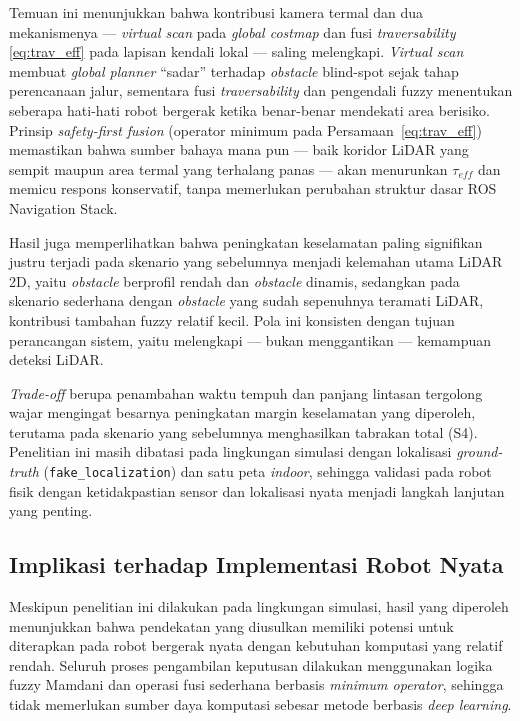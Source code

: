 \documentclass[10pt,twocolumn]{article}
\begin{document}
Temuan ini menunjukkan bahwa kontribusi kamera termal dan dua mekanismenya --- \textit{virtual scan} pada \textit{global costmap} dan fusi \textit{traversability} \eqref{eq:trav_eff} pada lapisan kendali lokal --- saling melengkapi. \textit{Virtual scan} membuat \textit{global planner} ``sadar'' terhadap \textit{obstacle} blind-spot sejak tahap perencanaan jalur, sementara fusi \textit{traversability} dan pengendali fuzzy menentukan seberapa hati-hati robot bergerak ketika benar-benar mendekati area berisiko. Prinsip \textit{safety-first fusion} (operator minimum pada Persamaan~\ref{eq:trav_eff}) memastikan bahwa sumber bahaya mana pun --- baik koridor LiDAR yang sempit maupun area termal yang terhalang panas --- akan menurunkan $\tau_{eff}$ dan memicu respons konservatif, tanpa memerlukan perubahan struktur dasar ROS Navigation Stack.

Hasil juga memperlihatkan bahwa peningkatan keselamatan paling signifikan justru terjadi pada skenario yang sebelumnya menjadi kelemahan utama LiDAR 2D, yaitu \textit{obstacle} berprofil rendah dan \textit{obstacle} dinamis, sedangkan pada skenario sederhana dengan \textit{obstacle} yang sudah sepenuhnya teramati LiDAR, kontribusi tambahan fuzzy relatif kecil. Pola ini konsisten dengan tujuan perancangan sistem, yaitu melengkapi --- bukan menggantikan --- kemampuan deteksi LiDAR.

\textit{Trade-off} berupa penambahan waktu tempuh dan panjang lintasan tergolong wajar mengingat besarnya peningkatan margin keselamatan yang diperoleh, terutama pada skenario yang sebelumnya menghasilkan tabrakan total (S4). Penelitian ini masih dibatasi pada lingkungan simulasi dengan lokalisasi \textit{ground-truth} (\texttt{fake\_localization}) dan satu peta \textit{indoor}, sehingga validasi pada robot fisik dengan ketidakpastian sensor dan lokalisasi nyata menjadi langkah lanjutan yang penting.

\subsection{Implikasi terhadap Implementasi Robot Nyata}

Meskipun penelitian ini dilakukan pada lingkungan simulasi, hasil yang diperoleh menunjukkan bahwa pendekatan yang diusulkan memiliki potensi untuk diterapkan pada robot bergerak nyata dengan kebutuhan komputasi yang relatif rendah. Seluruh proses pengambilan keputusan dilakukan menggunakan logika fuzzy Mamdani dan operasi fusi sederhana berbasis \textit{minimum operator}, sehingga tidak memerlukan sumber daya komputasi sebesar metode berbasis \textit{deep learning}.
\end{document}
